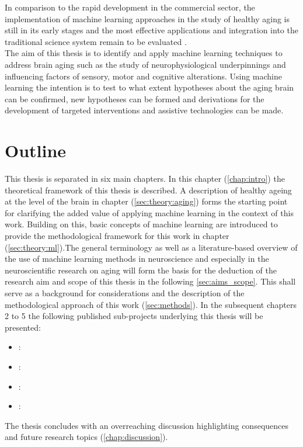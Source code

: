 In comparison to the rapid development in the commercial sector, the implementation of machine learning approaches in the study of healthy aging is still in its early stages and the most effective applications and integration into the traditional science system remain to be evaluated \cite{Bzdok2019}.\\
The aim of this thesis is to identify and apply machine learning techniques to address brain aging such as the study of neurophysiological underpinnings and influencing factors of sensory, motor and cognitive alterations. Using machine learning the intention is to test to what extent hypotheses about the aging brain can be confirmed, new hypotheses can be formed and derivations for the development of targeted interventions and assistive technologies can be made.

\section{Outline}
This thesis is separated in six main chapters. In this chapter (\autoref{chap:intro}) the theoretical framework of this thesis is described. A description of healthy ageing at the level of the brain in chapter (\autoref{sec:theory:aging}) forms the starting point for clarifying the added value of applying machine learning in the context of this work. Building on this, basic concepts of machine learning are introduced to provide the methodological framework for this work in chapter (\autoref{sec:theory:ml}).The general terminology as well as a literature-based overview of the use of machine learning methods in neuroscience and especially in the neuroscientific research on aging will form the basis for the deduction of the research aim and scope of this thesis in the following \autoref{sec:aims_scope}. This shall serve as a background for considerations and the description of the methodological approach of this work (\autoref{sec:methods}). In the subsequent chapters 2 to 5 the following published sub-projects underlying this thesis will be presented:
\begin{itemize}
\item {}:\\ 
\item {}:\\ 
\item {}:\\ 
\item {}:\\ 
\end{itemize}
\noindent The thesis concludes with an overreaching discussion highlighting consequences and future research topics (\autoref{chap:discussion}). 


